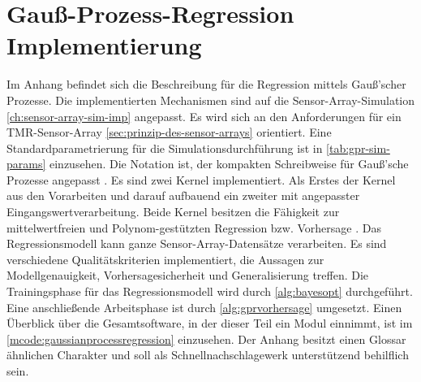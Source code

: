 %

\chapter{Gauß-Prozess-Regression Implementierung}\label{ch:gpr-imp}


Im Anhang befindet sich die Beschreibung für die Regression mittels Gauß'scher Prozesse. Die implementierten Mechanismen sind auf die Sensor-Array-Simulation \autoref{ch:sensor-array-sim-imp} angepasst. Es wird sich an den Anforderungen für ein TMR-Sensor-Array \autoref{sec:prinzip-des-sensor-arrays} orientiert. Eine Standardparametrierung für die Simulationsdurchführung ist in \autoref{tab:gpr-sim-params} einzusehen. Die Notation ist, der kompakten Schreibweise für Gauß'sche Prozesse angepasst \cite{Rasmussen2006}. Es sind zwei Kernel implementiert. Als Erstes der Kernel aus den Vorarbeiten \cite{Schuethe2020b}\cite{Schuethe2020} und darauf aufbauend ein zweiter mit angepasster Eingangswertverarbeitung. Beide Kernel besitzen die Fähigkeit zur mittelwertfreien und Polynom-gestützten Regression bzw. Vorhersage \cite{Rasmussen2006}. Das Regressionsmodell kann ganze Sensor-Array-Datensätze verarbeiten. Es sind verschiedene Qualitätskriterien implementiert, die Aussagen zur Modellgenauigkeit, Vorhersagesicherheit und Generalisierung treffen. Die Trainingsphase für das Regressionsmodell wird durch \autoref{alg:bayesopt} durchgeführt. Eine anschließende Arbeitsphase ist durch \autoref{alg:gprvorhersage} umgesetzt. Einen Überblick über die Gesamtsoftware, in der dieser Teil ein Modul einnimmt, ist im \autoref{mcode:gaussianprocessregression} einzusehen. Der Anhang besitzt einen Glossar ähnlichen Charakter und soll als Schnellnachschlagewerk unterstützend behilflich sein.


